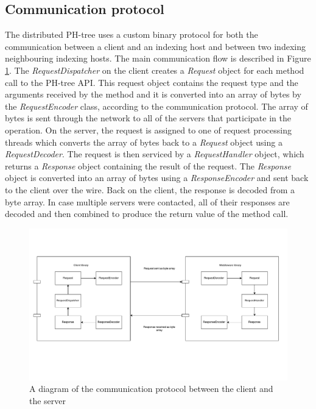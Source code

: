 \documentclass[11pt,a4paper]{globis-book}
\begin{document}
\subsection{Communication protocol}

The distributed PH-tree uses a custom binary protocol for both the communication between a client and an indexing host and between two indexing neighbouring indexing hosts. The main communication flow is described in Figure \ref{fig:Encoding}. The \textit{RequestDispatcher} on the client creates a \textit{Request} object for each method call to the PH-tree API. This request object contains the request type and the arguments received by the method and it is converted into an array of bytes by the \textit{RequestEncoder} class, according to the communication protocol. The array of bytes is sent through the network to all of the servers that participate in the operation. On the server, the request is assigned to one of request processing threads which converts the array of bytes back to a \textit{Request} object using a \textit{RequestDecoder}. The request is then serviced by a \textit{RequestHandler} object, which returns a \textit{Response} object containing the result of the request. The \textit{Response} object is converted into an array of bytes using a \textit{ResponseEncoder} and sent back to the client over the wire. Back on the client, the response is decoded from a byte array. In case multiple servers were contacted, all of their responses are decoded and then combined to produce the return value of the method call.

\begin{figure}[h]
    \centering 
    \includegraphics[scale=0.7]{images/Encoding}
    \caption{A diagram of the communication protocol between the client and the server}
    \label{fig:Encoding}
\end{figure}
\end{document}

